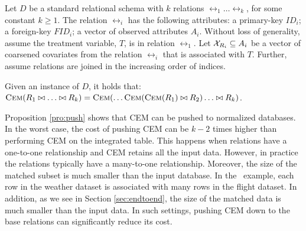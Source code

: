 Let $D$ be a standard relational schema with $k$ relations
$\rel_1 \ldots \rel_k$, for some constant $k \geq 1$. The relation $\rel_i$
has the following attributes:  a  primary-key $ID_i $;  a foreign-key $FID_i $;   a vector of observed attributes
 $A_i$.  Without loss of generality, assume the treatment variable, $T$, is in relation $\rel_1$.  Let
  ${{\mathcal{X}}}_{{{R}}_i} \subseteq {A}_i$ be a vector of coarsened covariates from the relation $\rel_i$ that is associated with $T$.
    Further, assume relations are joined in the increasing order of indices.



\begin{proposition} \label{pro:push}
Given an instance of $D$, it holds that: ${\textsc{Cem}}({{R}}_1  \bowtie
\ldots  \bowtie{{R}}_{k})= {\textsc{Cem}}( \ldots {\textsc{Cem}}({\textsc{Cem}}(R_1) \bowtie   R_2) \ldots  \bowtie R_{k}) $.
\end{proposition}


Proposition \ref{pro:push} shows that CEM can be pushed to normalized databases.  In the worst case, the cost of pushing CEM can be $k-2$ times higher than performing CEM
on the integrated table. This happens when relations have a one-to-one  relationship  and
CEM retains all the input data. However, in practice the relations typically have a  many-to-one
relationship. Moreover, the size of the matched subset is much smaller than the input database. In the \delay \ example,
each row in the weather dataset is associated with many rows in the flight dataset. In addition, as we see
in Section \ref{sec:endtoend}, the size of the matched data is much smaller than the input data. In such settings,
pushing CEM down to the base relations can significantly reduce its cost.


